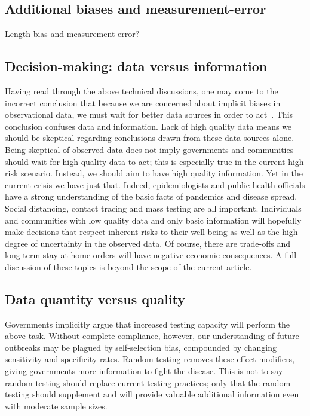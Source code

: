 \documentclass[11pt]{amsart}
\begin{document}
\subsection*{Additional biases and measurement-error}

Length bias and measurement-error?

\subsection*{Decision-making: data versus information}

Having read through the above technical discussions, one may come to the incorrect conclusion that because we are concerned about implicit biases in observational data, we must wait for better data sources in order to act~\citep{Ioannidis2020}.  This conclusion confuses data and information.  Lack of high quality data means we should be skeptical regarding conclusions drawn from these data sources alone.  Being skeptical of observed data does not imply governments and communities should wait for high quality data to act; this is especially true in the current high risk scenario.  Instead, we should aim to have high quality information.  Yet in the current crisis we have just that.  Indeed, epidemiologists and public health officials have a strong understanding of the basic facts of pandemics and disease spread.  Social distancing, contact tracing and mass testing are all important.  Individuals and communities with low quality data and only basic information will hopefully make decisions that respect inherent risks to their well being as well as the high degree of uncertainty in the observed data. Of course, there are trade-offs and long-term stay-at-home orders will have negative economic consequences.  A full discussion of these topics is beyond the scope of the current article.

\subsection*{Data quantity versus quality}

Governments implicitly argue that increased testing capacity will perform the above task.  Without complete compliance, however, our understanding of future outbreaks may be plagued by self-selection bias, compounded by changing sensitivity and specificity rates. Random testing removes these effect modifiers, giving governments more information to fight the disease.  This is not to say random testing should replace current testing practices; only that the random testing should supplement and will provide valuable additional information even with moderate sample sizes.
\end{document}
